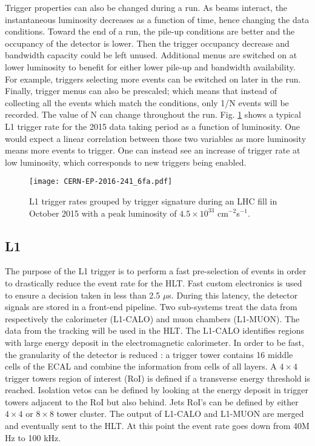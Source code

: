 Trigger properties can also be changed during a run.
As beams interact, the instantaneous luminosity decreases as a function of time, hence changing the data conditions.
Toward the end of a run, the pile-up conditions are better and the occupancy of the detector is lower.
Then the trigger occupancy decrease and bandwidth capacity could be left unused.
Additional menus are switched on at lower luminosity to benefit for either lower pile-up and bandwidth availability.
For example, triggers selecting more events can be switched on later in the run.
Finally, trigger menus can also be prescaled; which means that instead of collecting all the events which match the conditions, only 1/N events will be recorded.
The value of N can change throughout the run.
Fig. \ref{fig:orgae8f23c} shows a typical L1 trigger rate for the 2015 data taking period as a function of luminosity.
One would expect a linear correlation between those two variables as more luminosity means more events to trigger.
One can instead see an increase of trigger rate at low luminosity, which corresponds to new triggers being enabled.

\begin{figure}[htbp]
\centering
\texttt{[image: CERN-EP-2016-241\_6fa.pdf]}
\caption{\label{fig:orgae8f23c}
L1 trigger rates grouped by trigger signature during an LHC fill in October 2015 with a peak luminosity of $4.5\times10^{33}$ cm$^{-2}$s$^{-1}$. \cite{CERN-EP-2016-241}}
\end{figure}


\subsection{L1}
\label{sec:org0661072}

The purpose of the L1 trigger is to perform a fast pre-selection of events in order to drastically reduce the event rate for the HLT.
Fast custom electronics is used to ensure a decision taken in less than 2.5 $\mu$s.
During this latency, the detector signals are stored in a front-end pipeline.
Two sub-systems treat the data from respectively the calorimeter (L1-CALO) and muon chambers (L1-MUON).
The data from the tracking will be used in the HLT.
The L1-CALO \cite{ATL-COM-DAQ-2008-002} identifies regions with large energy deposit in the electromagnetic calorimeter.
In order to be fast, the granularity of the detector is reduced : a trigger tower contains 16 middle cells of the ECAL and combine the information from cells of all layers.
A $4\times 4$ trigger towers region of interest (RoI) is defined if a transverse energy threshold is reached.
Isolation vetos can be defined by looking at the energy deposit in trigger towers adjacent to the RoI but also behind.
Jets RoI's can be defined by either $4\times 4$ or $8\times 8$ tower cluster.
The output of L1-CALO and L1-MUON are merged and eventually sent to the HLT.
At this point the event rate goes down from 40M Hz to 100 kHz.


